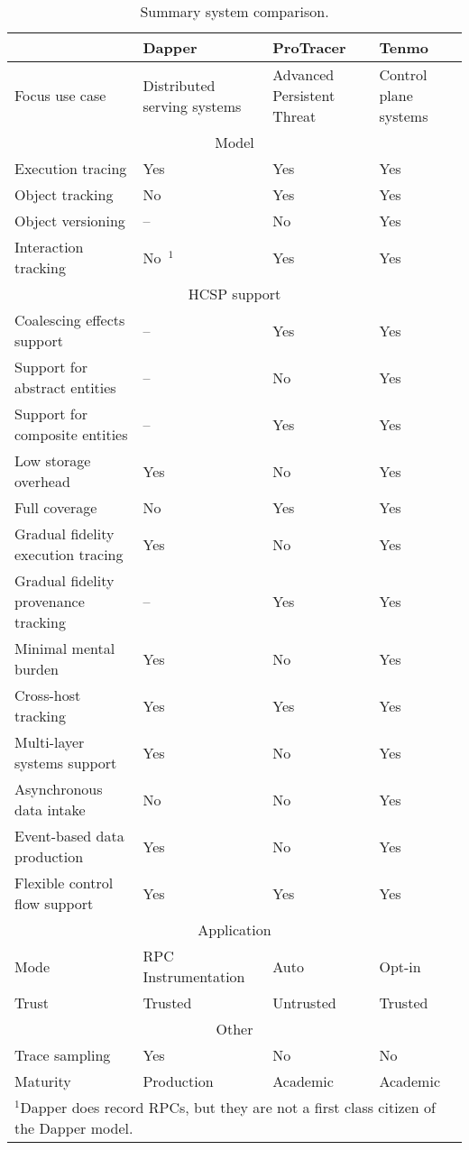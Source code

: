 \begin{table}[pht]
\centering
\begin{tabular}[t]{  p{5cm}  p{3cm}  p{3cm}  p{3cm}  }
\toprule
&Dapper&ProTracer&Tenmo\\
\midrule
Focus use case&Distributed serving systems&Advanced Persistent Threat&Control plane systems\\
\hline
\multicolumn{4}{c}{Model} \\
\hline
Execution tracing&Yes&Yes&Yes\\
Object tracking&No&Yes&Yes\\
Object versioning&--&No&Yes\\
Interaction tracking&No~$^{1}$&Yes&Yes\\
\hline
\multicolumn{4}{c}{HCSP support} \\
\hline
Coalescing effects support&--&Yes&Yes\\
Support for abstract entities&--&No&Yes\\
Support for composite entities&--&Yes&Yes\\
Low storage overhead&Yes&No&Yes\\
Full coverage&No&Yes&Yes\\
Gradual fidelity execution tracing&Yes&No&Yes\\
Gradual fidelity provenance tracking&--&Yes&Yes\\
Minimal mental burden&Yes&No&Yes\\
Cross-host tracking&Yes&Yes&Yes\\
Multi-layer systems support&Yes&No&Yes\\
Asynchronous data intake&No&No&Yes\\
Event-based data production&Yes&No&Yes\\
Flexible control flow support&Yes&Yes&Yes\\
\hline
\multicolumn{4}{c}{Application} \\
\hline
Mode&RPC Instrumentation&Auto&Opt-in\\
Trust&Trusted&Untrusted&Trusted\\
\hline
\multicolumn{4}{c}{Other} \\
\hline
Trace sampling&Yes&No&No\\
Maturity&Production&Academic&Academic\\
\bottomrule
\hline
\multicolumn{4}{l}{$^{1}$\footnotesize{Dapper does record RPCs, but they are not a first class citizen of the Dapper model.}} \\
\end{tabular}
\caption{Summary system comparison.}
\label{tbl:comparison}
\end{table}%

